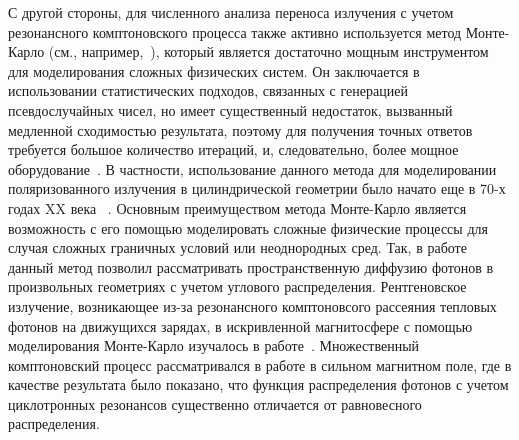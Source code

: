 \documentclass[14pt, russian]{article}
\begin{document}
 
С другой стороны, для численного анализа переноса излучения с учетом резонансного комптоновского процесса также активно используется метод Монте-Карло (см., например,~\cite{Araya:1999,Nobili:2008,Fernandez:2011,Yahel:1979,Taverna:2014,Mustukov:2021,Mushtukov:2022}), который является достаточно мощным инструментом для моделирования сложных физических систем. Он заключается в использовании статистических подходов, связанных с генерацией псевдослучайных чисел, но имеет существенный недостаток, вызванный медленной сходимостью результата, поэтому для получения точных ответов требуется большое количество итераций, и, следовательно, более мощное оборудование~\cite{Caflisch:1998,Hall:2009}. В частности, использование данного метода для моделировании поляризованного излучения в цилиндрической геометрии было начато еще в 70-х годах XX века ~\cite{Yahel:1979}. Основным преимуществом метода Монте-Карло является возможность с его помощью моделировать сложные физические процессы для случая сложных граничных условий или неоднородных сред. Так, в работе~\cite{Araya:1999} данный метод позволил рассматривать пространственную диффузию фотонов в произвольных геометриях с учетом углового распределения. Рентгеновское излучение, возникающее из-за резонансного комптоновсого рассеяния тепловых фотонов на движущихся зарядах, в искривленной магнитосфере с помощью моделирования Монте-Карло изучалось в работе~\cite{Fernandez:2007}. Множественный комптоновский процесс рассматривался в работе \cite{Mushtukov:2022} в сильном магнитном поле, где в качестве результата было показано, что функция распределения фотонов с учетом циклотронных резонансов существенно отличается от равновесного распределения.
\end{document}
